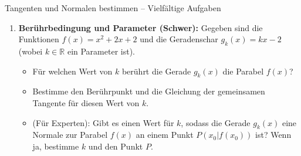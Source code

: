 \begin{aufgabenumgebung}{Tangenten und Normalen bestimmen – Vielfältige Aufgaben}
\begin{enumerate}
    \item \textbf{Berührbedingung und Parameter (Schwer):}
        Gegeben sind die Funktionen $f(x) = x^2 + 2x + 2$ und die Geradenschar $g_k(x) = kx - 2$ (wobei $k \in \mathbb{R}$ ein Parameter ist).
        \begin{itemize}
            \item Für welchen Wert von $k$ berührt die Gerade $g_k(x)$ die Parabel $f(x)$?
            \item Bestimme den Berührpunkt und die Gleichung der gemeinsamen Tangente für diesen Wert von $k$.
            \item (Für Experten): Gibt es einen Wert für $k$, sodass die Gerade $g_k(x)$ eine Normale zur Parabel $f(x)$ an einem Punkt $P(x_0|f(x_0))$ ist? Wenn ja, bestimme $k$ und den Punkt $P$.
        \end{itemize}
\end{enumerate}
\end{aufgabenumgebung}

